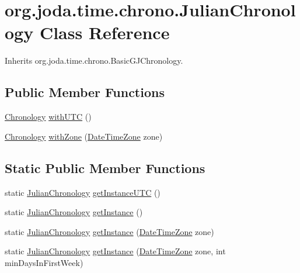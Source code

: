 \hypertarget{classorg_1_1joda_1_1time_1_1chrono_1_1_julian_chronology}{\section{org.\-joda.\-time.\-chrono.\-Julian\-Chronology Class Reference}
\label{classorg_1_1joda_1_1time_1_1chrono_1_1_julian_chronology}
}


Inherits org.\-joda.\-time.\-chrono.\-Basic\-G\-J\-Chronology.

\subsection*{Public Member Functions}
\begin{DoxyCompactItemize}
\item 
\hyperlink{classorg_1_1joda_1_1time_1_1_chronology}{Chronology} \hyperlink{classorg_1_1joda_1_1time_1_1chrono_1_1_julian_chronology_a30554cff54dffeed275a4c6c85a652dd}{with\-U\-T\-C} ()
\item 
\hyperlink{classorg_1_1joda_1_1time_1_1_chronology}{Chronology} \hyperlink{classorg_1_1joda_1_1time_1_1chrono_1_1_julian_chronology_a7992fd3ac05229a3d4982921da45d7c0}{with\-Zone} (\hyperlink{classorg_1_1joda_1_1time_1_1_date_time_zone}{Date\-Time\-Zone} zone)
\end{DoxyCompactItemize}
\subsection*{Static Public Member Functions}
\begin{DoxyCompactItemize}
\item 
static \hyperlink{classorg_1_1joda_1_1time_1_1chrono_1_1_julian_chronology}{Julian\-Chronology} \hyperlink{classorg_1_1joda_1_1time_1_1chrono_1_1_julian_chronology_a07e246eb2143436d002c8d0136835434}{get\-Instance\-U\-T\-C} ()
\item 
static \hyperlink{classorg_1_1joda_1_1time_1_1chrono_1_1_julian_chronology}{Julian\-Chronology} \hyperlink{classorg_1_1joda_1_1time_1_1chrono_1_1_julian_chronology_a9ae347cfcdc9d76ecbcf45172d4e19ee}{get\-Instance} ()
\item 
static \hyperlink{classorg_1_1joda_1_1time_1_1chrono_1_1_julian_chronology}{Julian\-Chronology} \hyperlink{classorg_1_1joda_1_1time_1_1chrono_1_1_julian_chronology_ac09f628401eb401116166a6a0a85e25b}{get\-Instance} (\hyperlink{classorg_1_1joda_1_1time_1_1_date_time_zone}{Date\-Time\-Zone} zone)
\item 
static \hyperlink{classorg_1_1joda_1_1time_1_1chrono_1_1_julian_chronology}{Julian\-Chronology} \hyperlink{classorg_1_1joda_1_1time_1_1chrono_1_1_julian_chronology_a0cca744533ebd196313d857738a61db8}{get\-Instance} (\hyperlink{classorg_1_1joda_1_1time_1_1_date_time_zone}{Date\-Time\-Zone} zone, int min\-Days\-In\-First\-Week)
\end{DoxyCompactItemize}
